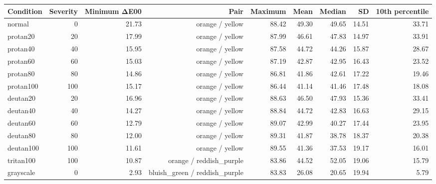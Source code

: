 \begin{tabular}{lrrrrrrrr}
\toprule
Condition & Severity & Minimum ΔE00 & Pair & Maximum & Mean & Median & SD & 10th percentile \\
\midrule
normal & 0 & 21.73 & orange / yellow & 88.42 & 49.30 & 49.65 & 14.51 & 33.71 \\
protan20 & 20 & 17.99 & orange / yellow & 87.99 & 46.61 & 47.83 & 14.97 & 33.91 \\
protan40 & 40 & 15.95 & orange / yellow & 87.58 & 44.72 & 44.26 & 15.87 & 28.67 \\
protan60 & 60 & 15.03 & orange / yellow & 87.19 & 42.87 & 42.95 & 16.43 & 23.52 \\
protan80 & 80 & 14.86 & orange / yellow & 86.81 & 41.86 & 42.61 & 17.22 & 19.46 \\
protan100 & 100 & 15.17 & orange / yellow & 86.44 & 41.14 & 41.46 & 17.48 & 18.08 \\
deutan20 & 20 & 16.96 & orange / yellow & 88.63 & 46.50 & 47.93 & 15.36 & 33.41 \\
deutan40 & 40 & 14.27 & orange / yellow & 88.84 & 44.72 & 42.83 & 16.63 & 29.15 \\
deutan60 & 60 & 12.79 & orange / yellow & 89.07 & 42.99 & 40.27 & 17.44 & 23.95 \\
deutan80 & 80 & 12.00 & orange / yellow & 89.31 & 41.87 & 38.78 & 18.37 & 20.38 \\
deutan100 & 100 & 11.61 & orange / yellow & 89.55 & 41.36 & 37.53 & 19.17 & 16.01 \\
tritan100 & 100 & 10.87 & orange / reddish\_purple & 83.86 & 44.52 & 52.05 & 19.06 & 15.79 \\
grayscale & 0 & 2.93 & bluish\_green / reddish\_purple & 83.83 & 26.08 & 20.65 & 19.94 & 5.79 \\
\bottomrule
\end{tabular}
